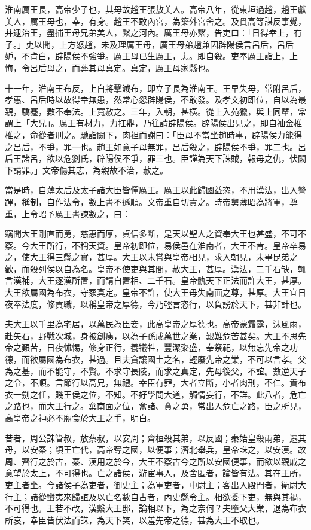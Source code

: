 
\begin{pinyinscope}
淮南厲王長，高帝少子也，其母故趙王張敖美人。高帝八年，從東垣過趙，趙王獻美人，厲王母也，幸，有身。趙王不敢內宮，為築外宮舍之。及貫高等謀反事覺，并逮治王，盡捕王母兄弟美人，繫之河內。厲王母亦繫，告吏曰：「日得幸上，有子。」吏以聞，上方怒趙，未及理厲王母，厲王母弟趙兼因辟陽侯言呂后，呂后妒，不肯白，辟陽侯不強爭。厲王母已生厲王，恚。即自殺。吏奉厲王詣上，上悔，令呂后母之，而葬其母真定。真定，厲王母家縣也。

十一年，淮南王布反，上自將擊滅布，即立子長為淮南王。王早失母，常附呂后，孝惠、呂后時以故得幸無患，然常心怨辟陽侯，不敢發。及孝文初即位，自以為最親，驕蹇，數不奉法。上寬赦之。三年，入朝，甚橫。從上入苑獵，與上同輦，常謂上「大兄」。厲王有材力，力扛鼎，乃往請辟陽侯。辟陽侯出見之，即自袖金椎椎之，命從者刑之。馳詣闕下，肉袒而謝曰：「臣母不當坐趙時事，辟陽侯力能得之呂后，不爭，罪一也。趙王如意子母無罪，呂后殺之，辟陽侯不爭，罪二也。呂后王諸呂，欲以危劉氏，辟陽侯不爭，罪三也。臣謹為天下誅賊，報母之仇，伏闕下請罪。」文帝傷其志，為親故不治，赦之。

當是時，自薄太后及太子諸大臣皆憚厲王。厲王以此歸國益恣，不用漢法，出入警蹕，稱制，自作法令，數上書不遜順。文帝重自切責之。時帝舅薄昭為將軍，尊重，上令昭予厲王書諫數之，曰：

竊聞大王剛直而勇，慈惠而厚，貞信多斷，是天以聖人之資奉大王也甚盛，不可不察。今大王所行，不稱天資。皇帝初即位，易侯邑在淮南者，大王不肯。皇帝卒易之，使大王得三縣之實，甚厚。大王以未嘗與皇帝相見，求入朝見，未畢昆弟之歡，而殺列侯以自為名。皇帝不使吏與其間，赦大王，甚厚。漢法，二千石缺，輒言漢補，大王逐漢所置，而請自置相、二千石。皇帝骫天下正法而許大王，甚厚。大王欲屬國為布衣，守冢真定。皇帝不許，使大王毋失南面之尊，甚厚。大王宜日夜奉法度，修貢職，以稱皇帝之厚德，今乃輕言恣行，以負謗於天下，甚非計也。

夫大王以千里為宅居，以萬民為臣妾，此高皇帝之厚德也。高帝蒙霜露，沬風雨，赴矢石，野戰次城，身被創痍，以為子孫成萬世之業，艱難危苦甚矣。大王不思先帝之艱苦，日夜怵惕，修身正行，養犧牲，豐潔粢盛，奉祭祀，以無忘先帝之功德，而欲屬國為布衣，甚過。且夫貪讓國土之名，輕廢先帝之業，不可以言孝。父為之基，而不能守，不賢。不求守長陵，而求之真定，先母後父，不誼。數逆天子之令，不順。言節行以高兄，無禮。幸臣有罪，大者立斷，小者肉刑，不仁。貴布衣一劍之任，賤王侯之位，不知。不好學問大道，觸情妄行，不詳。此八者，危亡之路也，而大王行之。棄南面之位，奮諸、賁之勇，常出入危亡之路，臣之所見，高皇帝之神必不廟食於大王之手，明白。

昔者，周公誅管叔，放蔡叔，以安周；齊桓殺其弟，以反國；秦始皇殺兩弟，遷其母，以安秦；頃王亡代，高帝奪之國，以便事；濟北舉兵，皇帝誅之，以安漢。故周、齊行之於古，秦、漢用之於今，大王不察古今之所以安國便事，而欲以親戚之意望於太上，不可得也。亡之諸侯，游宦事人，及舍匿者，論皆有法。其在王所，吏主者坐。今諸侯子為吏者，御史主；為軍吏者，中尉主；客出入殿門者，衛尉大行主；諸從蠻夷來歸誼及以亡名數自古者，內史縣令主。相欲委下吏，無與其禍，不可得也。王若不改，漢繫大王邸，論相以下，為之奈何？夫墮父大業，退為布衣所哀，幸臣皆伏法而誅，為天下笑，以羞先帝之德，甚為大王不取也。


\end{pinyinscope}
